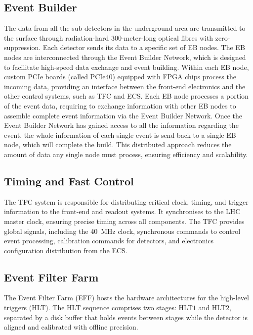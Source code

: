 \subsection{Event Builder}
The data from all the sub-detectors in the underground area are transmitted to the surface through radiation-hard 300-meter-long optical fibres with zero-suppression. Each detector sends its data to a specific set of EB nodes. The EB nodes are interconnected through the Event Builder Network, which is designed to facilitate high-speed data exchange and event building. Within each EB node, custom PCIe boards (called PCIe40) equipped with FPGA chips process the incoming data, providing an interface between the front-end electronics and the other control systems, such as TFC and ECS. Each EB node processes a portion of the event data, requiring to exchange information with other EB nodes to assemble complete event information via the Event Builder Network. Once the Event Builder Network has gained access to all the information regarding the event, the whole information of each single event is send back to a single EB node, which will complete the build.  This distributed approach reduces the amount of data any single node must process, ensuring efficiency and scalability. 



\subsection{Timing and Fast Control}
The TFC system is responsible for distributing critical clock, timing, and trigger information to the front-end and readout systems. It synchronises to the LHC master clock, ensuring precise timing across all components. The TFC provides global signals, including the \SI{40}{\mega\hertz} clock, synchronous commands to control event processing, calibration commands for detectors, and electronics configuration distribution from the ECS.

\subsection{Event Filter Farm}
The Event Filter Farm (EFF) hosts the hardware architectures for the high-level triggers (HLT). The HLT sequence comprises two stages: HLT$1$ and HLT$2$, separated by a disk buffer that holds events between stages while the detector is aligned and calibrated with offline precision.

